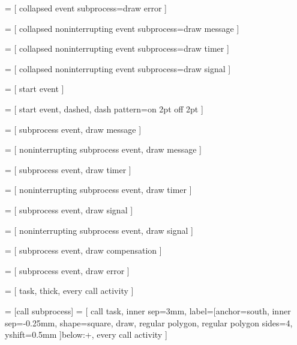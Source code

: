  = [
	collapsed event subprocess=draw error
]

 = [
	collapsed noninterrupting event subprocess=draw message
]

 = [
	collapsed noninterrupting event subprocess=draw timer
]

 = [
	collapsed noninterrupting event subprocess=draw signal
]

 = [
	start event
]

 = [
	start event,
	dashed,
	dash pattern=on 2pt off 2pt
]

 = [
	subprocess event,
	draw message
]

 = [
	noninterrupting subprocess event,
	draw message
]

 = [
	subprocess event,
	draw timer
]

 = [
	noninterrupting subprocess event,
	draw timer
]

 = [
	subprocess event,
	draw signal
]

 = [
	noninterrupting subprocess event,
	draw signal
]

 = [
	subprocess event,
	draw compensation
]

 = [
	subprocess event,
	draw error
]


 = [
	task,
	thick,
	every call activity
]

 = [call subprocess]
 = [
	call task, 
	inner sep=3mm, 
	label={[anchor=south,
		inner sep=-0.25mm,
		shape=square,
		draw,
		regular polygon,
		regular polygon sides=4,
		yshift=0.5mm
	]below:\footnotesize +},
	every call activity
]


